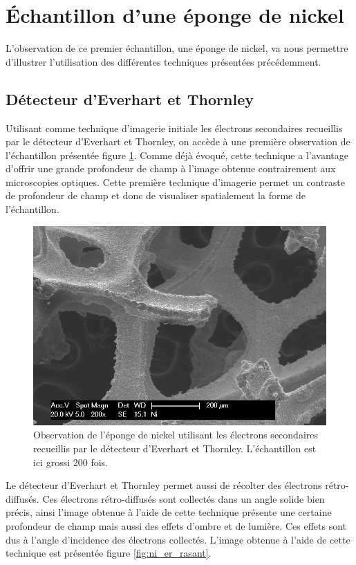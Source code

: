 \documentclass[a4paper,12pt]{article}
\newcommand\ett{Everhart et Thornley\xspace}
\begin{document}
\section{Échantillon d'une éponge de nickel}

L'observation de ce premier échantillon, une éponge de nickel, va nous permettre d'illustrer l'utilisation des différentes techniques présentées précédemment.

\subsection{Détecteur d'\ett}

Utilisant comme technique d'imagerie initiale les électrons secondaires recueillis par le détecteur d'\ett,
on accède à une première observation de l'échantillon présentée figure \ref{fig:ni_es}. Comme déjà évoqué,
cette technique a l'avantage d'offrir une grande profondeur de champ à l'image obtenue contrairement aux microscopies optiques. Cette première technique d'imagerie permet un contraste de profondeur de champ et donc de visualiser spatialement la forme de l'échantillon.

\begin{figure}
\centering
\includegraphics[width = 0.7 \textwidth]{images/ni_es.png}
\caption{Observation de l'éponge de nickel utilisant les électrons secondaires recueillis par le détecteur d'\ett. L'échantillon est ici grossi 200 fois.}
\label{fig:ni_es}
\end{figure}

Le détecteur d'\ett permet aussi de récolter des électrons rétro-diffusés. Ces électrons rétro-diffusés sont
collectés dans un angle solide bien précis, ainsi l'image obtenue à l'aide de cette technique présente une
certaine profondeur de champ mais aussi des effets d'ombre et de lumière. Ces effets sont dus à l'angle
d'incidence des électrons collectés. L'image obtenue à l'aide de cette technique est présentée figure
\ref{fig:ni_er_rasant}.
\end{document}
